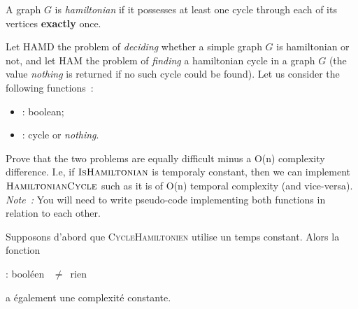 \documentclass[12pt,addpoints]{exam}
\begin{document}
\begin{questions}

\question
A graph $G$ is \emph{hamiltonian} if it possesses at least one cycle through each of its vertices \textbf{exactly} once.

Let HAMD the problem of \emph{deciding} whether a simple graph $G$ is hamiltonian or not, and let HAM the problem of \emph{finding} a hamiltonian cycle in a graph $G$ (the value \emph{nothing} is returned if no such cycle could be found). Let us consider the following functions~:
\begin{itemize}
  \item {} : boolean;
  \item {} : cycle or \emph{nothing}.
\end{itemize}
Prove that the two problems are equally difficult minus a O(n) complexity difference. I.e, if $\textsc{IsHamiltonian}$ is temporaly constant, then we can implement $\textsc{HamiltonianCycle}$ such as it is of O(n) temporal complexity (and vice-versa). \emph{Note~:} You will need to write pseudo-code implementing both functions in relation to each other.
\begin{solution}
Supposons d'abord que \textsc{CycleHamiltonien} utilise un temps constant. Alors la fonction
\begin{algorithmic}[1]
   : booléen
    \State \Return {}~$\neq$~rien
  \EndFunction
\end{algorithmic}
a également une complexité constante.


\end{solution}
\end{questions}
\end{document}
